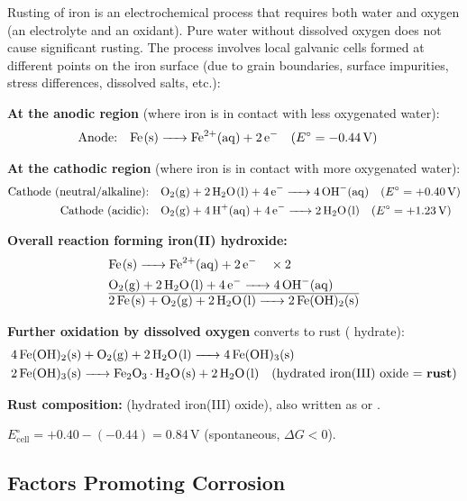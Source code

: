 Rusting of iron is an electrochemical process that requires both water and oxygen (an electrolyte and an oxidant). Pure water without dissolved oxygen does not cause significant rusting. The process involves local galvanic cells formed at different points on the iron surface (due to grain boundaries, surface impurities, stress differences, dissolved salts, etc.):

\begin{conceptbox}
\textbf{At the anodic region} (where iron is in contact with less oxygenated water):
\begin{align*}
\text{Anode:}& \quad \ce{Fe(s) -> Fe^2+(aq) + 2e-} \quad (E^\circ = -0.44\,\text{V})
\end{align*}

\textbf{At the cathodic region} (where iron is in contact with more oxygenated water):
\begin{align*}
\text{Cathode (neutral/alkaline):}& \quad \ce{O2(g) + 2H2O(l) + 4e- -> 4OH-(aq)} \quad (E^\circ = +0.40\,\text{V})\\
\text{Cathode (acidic):}& \quad \ce{O2(g) + 4H+(aq) + 4e- -> 2H2O(l)} \quad (E^\circ = +1.23\,\text{V})
\end{align*}

\textbf{Overall reaction forming iron(II) hydroxide:}
\begin{align*}
&\ce{Fe(s) -> Fe^2+(aq) + 2e-} \quad \times 2\\
&\ce{O2(g) + 2H2O(l) + 4e- -> 4OH-(aq)}\\
\hline
&\ce{2Fe(s) + O2(g) + 2H2O(l) -> 2Fe(OH)2(s)}
\end{align*}

\textbf{Further oxidation by dissolved oxygen} converts  to rust ( hydrate):
\begin{align*}
&\ce{4Fe(OH)2(s) + O2(g) + 2H2O(l) -> 4Fe(OH)3(s)}\\
&\ce{2Fe(OH)3(s) -> Fe2O3 . H2O(s) + 2H2O(l)} \quad \text{(hydrated iron(III) oxide = \textbf{rust})}
\end{align*}

\textbf{Rust composition:}  (hydrated iron(III) oxide), also written as  or .

$E^\circ_{\text{cell}} = +0.40 - (-0.44) = 0.84\,\text{V}$ (spontaneous, $\Delta G < 0$).
\end{conceptbox}

\subsection{Factors Promoting Corrosion}

